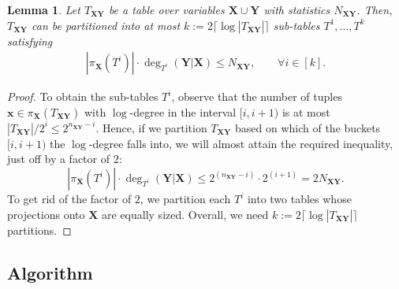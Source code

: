 \documentclass[10pt,a4paper]{article}
\newtheorem{lemma}{Lemma}[section]
\begin{document}
\begin{lemma}
Let $T_{\bm X\bm Y}$ be a table over variables $\bm X \cup \bm Y$ with statistics $N_{\bm X\bm Y}$.
Then, $T_{\bm X\bm Y}$ can be partitioned into at most
$k := 2 \lceil \log |T_{\bm X\bm Y}| \rceil $ sub-tables $T^{1},\dots,T^{k}$
satisfying
\begin{align}
  |\pi_{\bm X}(T^{i})| \cdot \deg_{T^{i}}(\bm Y |\bm X) \leq N_{\bm X\bm Y}, \quad\quad \forall i \in [k].
  \label{eq:partition}
\end{align}
\label{lmm:partition}
\end{lemma}
\begin{proof}
To obtain the sub-tables $T^{i}$, observe that the number of tuples $\bm x \in
\pi_{\bm X}(T_{\bm X\bm Y})$ with $\log$-degree in the interval
$[i,i+1)$ is at most $|T_{\bm X\bm Y}|/2^i \leq 2^{n_{\bm X\bm Y}-i}$.
Hence, if we partition $T_{\bm X\bm Y}$ based on which of the buckets $[i,i+1)$ the
$\log$-degree falls into, we will almost attain the required inequality, just off by a factor of $2$:
\[ |\pi_{\bm X}(T^{i})| \cdot \deg_{T^{i}}(\bm Y |\bm X)  \leq 2^{(n_{\bm X\bm Y}-i)}\cdot2^{(i+1)} = 2N_{\bm X\bm Y}. \]
To get rid of the factor of $2$, we partition each $T^{i}$ into two
tables whose projections onto $\bm X$ are equally sized. Overall, we need
$k := 2\lceil \log |T_{\bm X\bm Y}| \rceil$ partitions.
\end{proof}

\subsection{Algorithm}
\label{subsec:algorithm}
\end{document}
